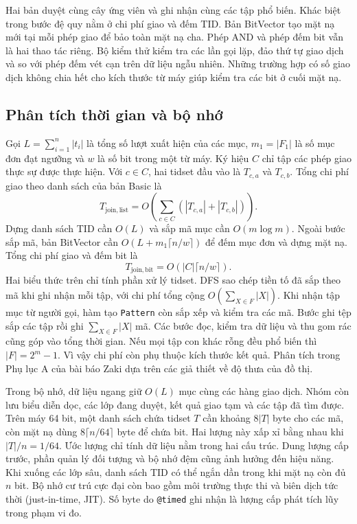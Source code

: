 Hai bản duyệt cùng cây ứng viên và ghi nhận cùng các tập phổ biến.
Khác biệt trong bước đệ quy nằm ở chi phí giao và đếm TID. Bản BitVector
tạo mặt nạ mới tại mỗi phép giao để bảo toàn mặt nạ cha. Phép AND và
phép đếm bit vẫn là hai thao tác riêng. Bộ kiểm thử kiểm tra các lần gọi
lặp, đảo thứ tự giao dịch và so với phép đếm vét cạn trên dữ liệu ngẫu
nhiên. Những trường hợp có số giao dịch không chia hết cho kích thước
từ máy giúp kiểm tra các bit ở cuối mặt nạ.

\subsection{Phân tích thời gian và bộ nhớ}
Gọi $L=\sum_{i=1}^n|t_i|$ là tổng số lượt xuất hiện của các mục,
$m_1=|F_1|$ là số mục đơn đạt ngưỡng và $w$ là số bit trong một từ máy.
Ký hiệu $C$ chỉ tập các phép giao thực sự được thực hiện. Với $c\in C$,
hai tidset đầu vào là $T_{c,a}$ và $T_{c,b}$. Tổng chi phí giao theo
danh sách của bản Basic là
\begin{equation}
 T_{\mathrm{join,list}}=O\!\left(\sum_{c\in C}
 (|T_{c,a}|+|T_{c,b}|)\right).
 \label{eq:list-cost}
\end{equation}
Dựng danh sách TID cần $O(L)$ và sắp mã mục cần $O(m\log m)$. Ngoài
bước sắp mã, bản BitVector cần $O(L+m_1\lceil n/w\rceil)$ để đếm mục
đơn và dựng mặt nạ. Tổng chi phí giao và đếm bit là
\begin{equation}
 T_{\mathrm{join,bit}}=O\!\left(|C|\lceil n/w\rceil\right).
 \label{eq:bit-cost}
\end{equation}
Hai biểu thức trên chỉ tính phần xử lý tidset. DFS sao chép tiền tố đã
sắp theo mã khi ghi nhận mỗi tập, với chi phí tổng cộng
$O(\sum_{X\in F}|X|)$. Khi nhận tập mục từ người gọi, hàm tạo
\texttt{Pattern} còn sắp xếp và kiểm tra các mã. Bước ghi tệp sắp các
tập rồi ghi $\sum_{X\in F}|X|$ mã. Các bước đọc, kiểm tra dữ liệu và
thu gom rác cũng góp vào tổng thời gian. Nếu mọi tập con khác rỗng
đều phổ biến thì $|F|=2^m-1$. Vì vậy chi phí còn phụ thuộc kích thước
kết quả. Phân tích trong Phụ lục A của bài báo Zaki dựa trên các giả
thiết về độ thưa của đồ thị.

Trong bộ nhớ, dữ liệu ngang giữ $O(L)$ mục cùng các hàng giao dịch.
Nhóm còn lưu biểu diễn dọc, các lớp đang duyệt, kết quả giao tạm và
các tập đã tìm được. Trên máy 64 bit, một danh sách chứa tidset $T$
cần khoảng $8|T|$ byte cho các mã, còn mặt nạ dùng
$8\lceil n/64\rceil$ byte để chứa bit. Hai lượng này xấp xỉ bằng nhau
khi $|T|/n=1/64$. Ước lượng chỉ tính dữ liệu nằm trong hai cấu trúc.
Dung lượng cấp trước, phần quản lý đối tượng và bộ nhớ đệm cũng ảnh
hưởng đến hiệu năng. Khi xuống các lớp sâu, danh sách TID có thể ngắn
dần trong khi mặt nạ còn đủ $n$ bit. Bộ nhớ cư trú cực đại còn bao
gồm môi trường thực thi và biên dịch tức thời (just-in-time, JIT).
Số byte do \texttt{@timed} ghi nhận là lượng cấp phát tích lũy trong
phạm vi đo.

